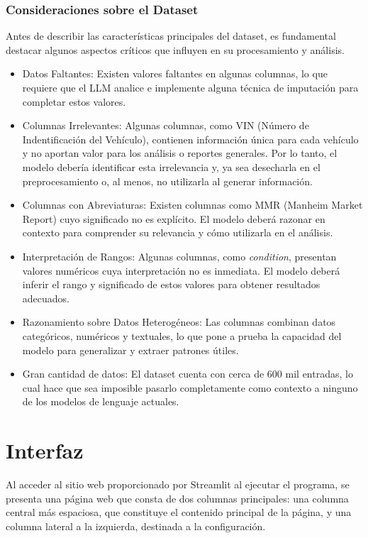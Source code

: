 \subsubsection{Consideraciones sobre el Dataset}
Antes de describir las características principales del dataset, es fundamental destacar algunos aspectos críticos que influyen en su procesamiento y análisis.
\begin{itemize}
	\item{Datos Faltantes:}
	Existen valores faltantes en algunas columnas, lo que requiere que el LLM analice e implemente alguna técnica de imputación para completar estos valores.
	
	\item{Columnas Irrelevantes:}
	Algunas columnas, como VIN (Número de Indentificación del Vehículo), contienen información única para cada vehículo y no aportan valor para los análisis o reportes generales. Por lo tanto, el modelo debería identificar esta irrelevancia y, ya sea desecharla en el preprocesamiento o, al menos, no utilizarla al generar información.
	
	\item{Columnas con Abreviaturas:}
	Existen columnas como MMR (Manheim Market Report) cuyo significado no es explícito. El modelo deberá razonar en contexto para comprender su relevancia y cómo utilizarla en el análisis.
	
	\item{Interpretación de Rangos:}
	Algunas columnas, como \textit{condition}, presentan valores numéricos cuya interpretación no es inmediata. El modelo deberá inferir el rango y significado de estos valores para obtener resultados adecuados.
	
	\item{Razonamiento sobre Datos Heterogéneos:}
	Las columnas combinan datos categóricos, numéricos y textuales, lo que pone a prueba la capacidad del modelo para generalizar y extraer patrones útiles.
	
	\item{Gran cantidad de datos:}
	El dataset cuenta con cerca de 600 mil entradas, lo cual hace que sea imposible pasarlo completamente como contexto a ninguno de los modelos de lenguaje actuales.
\end{itemize}

\section{Interfaz}
Al acceder al sitio web proporcionado por Streamlit al ejecutar el programa, se presenta una página web que consta de dos columnas principales: una columna central más espaciosa, que constituye el contenido principal de la página, y una columna lateral a la izquierda, destinada a la configuración.

